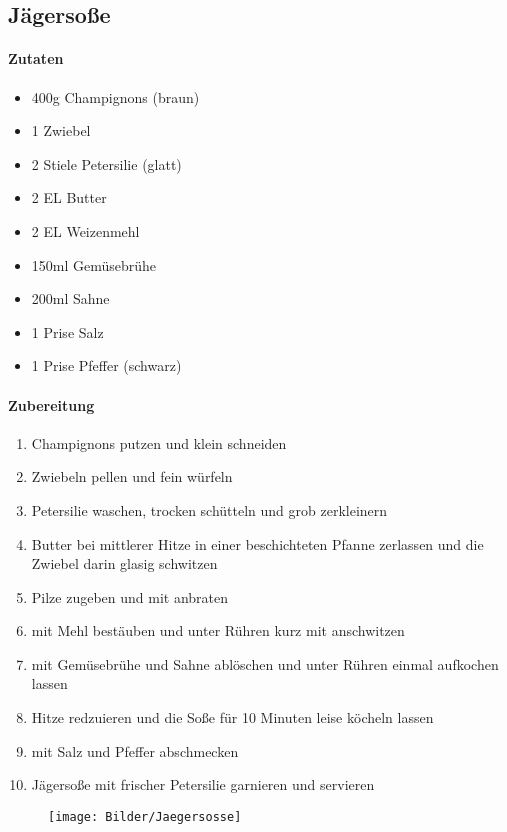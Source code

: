 \newpage
\subsection{Jägersoße}
\paragraph{Zutaten}
\begin{itemize}[noitemsep]
	\item 400g Champignons (braun)
	\item 1 Zwiebel
	\item 2 Stiele Petersilie (glatt)
	\item 2 EL Butter
	\item 2 EL Weizenmehl
	\item 150ml Gemüsebrühe
	\item 200ml Sahne
	\item 1 Prise Salz
	\item 1 Prise Pfeffer (schwarz)
\end{itemize}
\paragraph{Zubereitung}
\begin{enumerate}[noitemsep]
	\item Champignons putzen und klein schneiden
	\item Zwiebeln pellen und fein würfeln
	\item Petersilie waschen, trocken schütteln und grob zerkleinern
	\item Butter bei mittlerer Hitze in einer beschichteten Pfanne zerlassen und die Zwiebel darin glasig schwitzen
	\item Pilze zugeben und mit anbraten
	\item mit Mehl bestäuben und unter Rühren kurz mit anschwitzen
	\item mit Gemüsebrühe und Sahne ablöschen und unter Rühren einmal aufkochen lassen
	\item Hitze redzuieren und die Soße für 10 Minuten leise köcheln lassen
	\item mit Salz und Pfeffer abschmecken
	\item Jägersoße mit frischer Petersilie garnieren und servieren
\end{enumerate}
\begin{figure}[h]
	\centering
	\texttt{[image: Bilder/Jaegersosse]}
\end{figure}